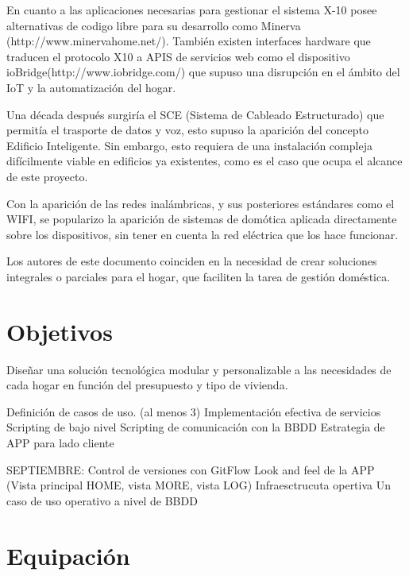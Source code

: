 En cuanto a las aplicaciones necesarias para gestionar el sistema X-10 posee alternativas de codigo libre para su desarrollo como Minerva (http://www.minervahome.net/). También existen interfaces hardware que traducen el protocolo X10 a APIS de servicios web como el dispositivo ioBridge(http://www.iobridge.com/) que supuso una disrupción en el ámbito del IoT y la automatización del hogar.

Una década después surgiría el SCE (Sistema de Cableado Estructurado) que permitía el trasporte de datos y voz, esto supuso la aparición del concepto Edificio Inteligente. Sin embargo, esto requiera de una instalación compleja difícilmente viable en edificios ya existentes, como es el caso que ocupa el alcance de este proyecto.

Con la aparición de las redes inalámbricas, y sus posteriores estándares como el WIFI, se popularizo la aparición de sistemas de domótica aplicada directamente sobre los dispositivos, sin tener en cuenta la red eléctrica que los hace funcionar.

Los autores de este documento coinciden en la necesidad de crear soluciones integrales o parciales para el hogar, que faciliten la tarea de gestión doméstica.



\section{Objetivos}
\label{makereference1.2}

Diseñar una solución tecnológica modular y personalizable a las necesidades de cada hogar en función del presupuesto y tipo de vivienda.

Definición de casos de uso. (al menos 3)
Implementación efectiva de servicios
Scripting de bajo nivel
Scripting de comunicación con la BBDD
Estrategia de APP para lado cliente

SEPTIEMBRE:
Control de versiones con GitFlow
Look and feel de la APP (Vista principal HOME, vista MORE, vista LOG)
Infraesctrucuta opertiva
Un caso de uso operativo a nivel de BBDD


\section{Equipación}
\label{makereference1.3}

